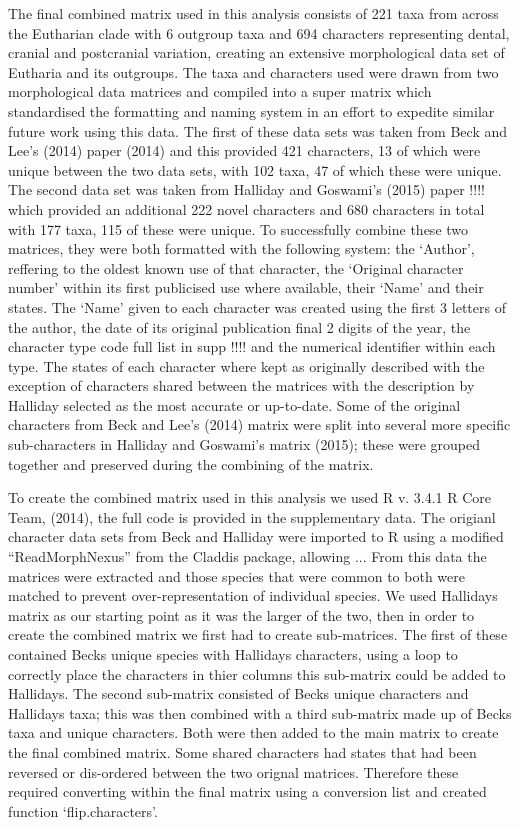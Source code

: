 \documentclass[11pt,letterpaper]{article}
\begin{document}
The final combined matrix used in this analysis consists of 221 taxa from across the Eutharian clade with 6 outgroup taxa and 694 characters representing dental, cranial and postcranial variation, creating an extensive morphological data set of Eutharia and its outgroups. The taxa and characters used were drawn from two morphological data matrices and compiled into a super matrix which standardised the formatting and naming system in an effort to expedite similar future work using this data. The first of these data sets was taken from Beck and Lee's (2014) paper (2014) and this provided 421 characters, 13 of which were unique between the two data sets, with 102 taxa, 47 of which these were unique. The second data set was taken from Halliday and Goswami's (2015) paper !!!! which provided an additional 222 novel characters and 680 characters in total with 177 taxa, 115 of these were unique. To successfully combine these two matrices, they were both formatted with the following system: the `Author', reffering to the oldest known use of that character, the `Original character number' within its first publicised use where available, their `Name' and their states. The `Name' given to each character was created using the first 3 letters of the author, the date of its original publication final 2 digits of the year, the character type code full list in supp !!!! and the numerical identifier within each type. The states of each character where kept as originally described with the exception of characters shared between the matrices with the description by Halliday selected as the most accurate or up-to-date. Some of the original characters from Beck and Lee's (2014) matrix were split into several more specific sub-characters in Halliday and Goswami's matrix (2015); these were grouped together and preserved during the combining of the matrix.

To create the combined matrix used in this analysis we used R v. 3.4.1 R Core Team, (2014), the full code is provided in the supplementary data. The origianl character data sets from Beck and Halliday were imported to R using a modified ``ReadMorphNexus'' from the Claddis package, allowing ... From this data the matrices were extracted and those species that were common to both were matched to prevent over-representation of individual species. We used Hallidays matrix as our starting point as it was the larger of the two, then in order to create the combined matrix we first had to create sub-matrices. The first of these contained Becks unique species with Hallidays characters, using a loop to correctly place the characters in thier columns this sub-matrix could be added to Hallidays. The second sub-matrix consisted of Becks unique characters and Hallidays taxa; this was then combined with a third sub-matrix made up of Becks taxa and unique characters. Both were then added to the main matrix to create the final combined matrix. Some shared characters had states that had been reversed or dis-ordered between the two orignal matrices. Therefore these required converting within the final matrix using a conversion list and created function `flip.characters'.
\end{document}
